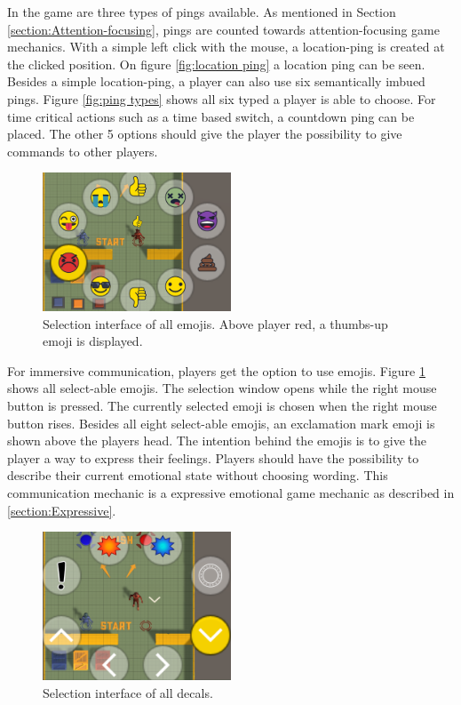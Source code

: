 In the game are three types of pings available. As mentioned in
Section \ref{section:Attention-focusing}, pings are counted towards attention-focusing game mechanics. With a simple left click with the mouse, a location-ping is created at the clicked position. On figure \ref{fig:location ping} a location ping can be seen.
Besides a simple location-ping, a player can also use six semantically imbued pings. Figure \ref{fig:ping types} shows all six typed a player is able to choose. For time critical actions such as a time based switch, a countdown ping can be placed. The other 5 options should give the player the possibility to give commands to other players. 


\begin{figure}
    \centering
    \includegraphics[width=0.5\textwidth]{images/emoji_selection.png}
    \caption{Selection interface of all emojis. Above player red, a thumbs-up emoji is displayed.}
    \label{fig:emoji selection}
\end{figure}

For immersive communication, players get the option to use emojis.
Figure \ref{fig:emoji selection} shows all select-able emojis. The selection window opens while the right mouse button is pressed. The currently selected emoji is chosen when the right mouse button rises.
Besides all eight select-able emojis, an exclamation mark emoji is shown above the players head. The intention behind the emojis is to give the player a way to express their feelings. Players should have the possibility to describe their current emotional state without choosing wording. This communication mechanic is a expressive emotional game mechanic as described in \ref{section:Expressive}.


\begin{figure}
    \centering
    \includegraphics[width=0.5\textwidth]{images/decal_selection.png}
    \caption{Selection interface of all decals.}
    \label{fig:decal selection}
\end{figure}

